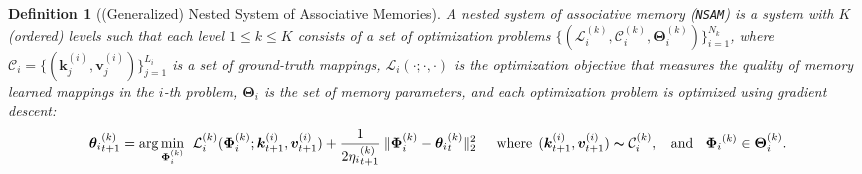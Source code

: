 \documentclass{article}
\newcommand{\vv}{\mathbf{v}}
\newtheorem{dfn}{Definition}
\newcommand{\vk}{\boldsymbol{k}}
\renewcommand{\vv}{\boldsymbol{v}}
\newcommand{\nsam}{\texttt{NSAM}}
\begin{document}
{\begin{dfn}[(Generalized) Nested System of Associative Memories] \label{dfn:gnsam}
    A nested system of associative memory (\nsam) is a system with $K$ (ordered) levels such that each level $1 \leq k \leq K$ consists of a set of optimization problems $\{ (\mathcal{L}^{(k)}_{i},  \mathcal{C}^{(k)}_i, \boldsymbol{\Theta}^{(k)}_{i}) \}_{i = 1}^{N_k}$, where $\mathcal{C}_i = \{(\vk^{(i)}_j, \vv^{(i)}_j) \}_{j = 1}^{L_{i}}$ is a set of ground-truth mappings, $\mathcal{L}_{i}(\cdot; \cdot, \cdot)$ is the optimization objective that measures the quality of memory learned mappings in the $i$-th problem, $\boldsymbol{\Theta}_{i}$ is the set of memory parameters, and each optimization problem is optimized using gradient descent:
    \begin{align}
        {\boldsymbol{\theta}_{i}}^{(k)}_{t+1} = \arg\min_{\boldsymbol{\Phi}^{(k)}_{i}} \:\:  \mathcal{L}^{(k)}_i(\boldsymbol{\Phi}^{(k)}_{i}; \vk^{(i)}_{t+1}, \vv^{(i)}_{t+1}) + \frac{1}{2{\eta_{i}}^{(k)}_{t+1}}\:\|\boldsymbol{\Phi}^{(k)}_{i} - {\boldsymbol{\theta}_{i}}^{(k)}_{t} \|^{2}_2 \quad \:\: \text{where}\:\: (\vk^{(i)}_{t+1}, \vv^{(i)}_{t+1}) \thicksim \mathcal{C}^{(k)}_i, \:\:\:\: \text{and} \:\:\: \:{\boldsymbol{\Phi}_{i}}^{(k)} \in  \boldsymbol{\Theta}^{(k)}_{i}.
    \end{align}
\end{dfn} 

}
\end{document}
